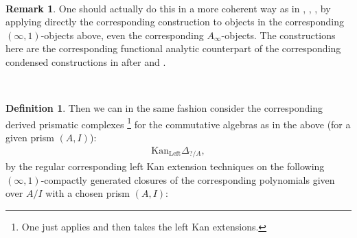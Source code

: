 \documentclass[11pt]{book}
\theoremstyle{definition}
\newtheorem{definition}[theorem]{Definition}
\newtheorem{remark}[theorem]{Remark}
\numberwithin{equation}{section}
\begin{document}
\

\begin{remark}
One should actually do this in a more coherent way as in \cite{Ra}, \cite{12NS}, \cite{KKM}, by applying directly the corresponding construction to objects in the corresponding $(\infty,1)$-objects above, even the corresponding $A_\infty$-objects. The constructions here are the corresponding functional analytic counterpart of the corresponding condensed constructions in \cite{M} after \cite{12CS1} and \cite{12CS2}.
\end{remark}


\

\begin{definition}
Then we can in the same fashion consider the corresponding derived prismatic complexes \cite[Construction 7.6]{12BS}\footnote{One just applies \cite[Construction 7.6]{12BS} and then takes the left Kan extensions.} for the commutative algebras as in the above (for a given prism $(A,I)$):
\begin{align}
\mathrm{Kan}_{\mathrm{Left}}\Delta_{?/A},	
\end{align}
by the regular corresponding left Kan extension techniques on the following $(\infty,1)$-compactly generated closures of the corresponding polynomials given over $A/I$ with a chosen prism $(A,I)$:



\end{definition}
\end{document}
